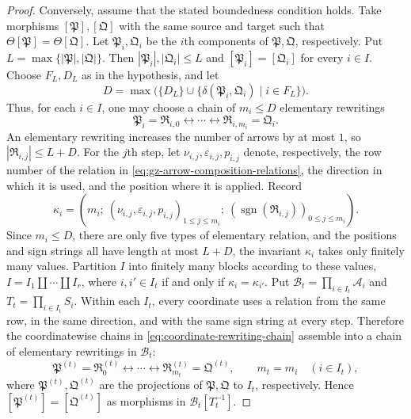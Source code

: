 \documentclass[10pt,a4paper]{amsart}
\theoremstyle{plain}
\theoremstyle{definition}
\theoremstyle{remark}
\begin{document}
\begin{proof}
  Conversely, assume that the stated boundedness condition holds.
  Take morphisms $[\mathfrak P],[\mathfrak Q]$ with the same source and target such that $\Theta[\mathfrak P]=\Theta[\mathfrak Q]$.
  Let $\mathfrak P_i,\mathfrak Q_i$ be the $i$th components of $\mathfrak P, \mathfrak Q$, respectively.
  Put $L=\max\{|\mathfrak P|,|\mathfrak Q|\}$.
  Then $|\mathfrak P_i|,|\mathfrak Q_i|\leq L$ and $[\mathfrak P_i]=[\mathfrak Q_i]$ for every $i\in I$.
  Choose $F_L,D_L$ as in the hypothesis, and let
  \begin{equation}\label{eq:uniform-rewriting-bound}
    D=\max\bigl(\{D_L\}\cup
    \{\delta(\mathfrak P_i,\mathfrak Q_i)\mid i\in F_L\}\bigr).
  \end{equation}
  Thus, for each $i\in I$, one may choose a chain of $m_i\leq D$ elementary rewritings
  \begin{equation}\label{eq:coordinate-rewriting-chain}
    \mathfrak P_i=\mathfrak R_{i,0}
    \longleftrightarrow\cdots
    \longleftrightarrow\mathfrak R_{i,m_i}=\mathfrak Q_i.
  \end{equation}
  An elementary rewriting increases the number of arrows by at most $1$, so $|\mathfrak R_{i,j}|\leq L+D$.
  For the $j$th step, let $\nu_{i,j},\varepsilon_{i,j},p_{i,j}$ denote, respectively, the row number of the relation in \eqref{eq:gz-arrow-composition-relations}, the direction in which it is used, and the position where it is applied.
  Record
  \[
    \kappa_i=\left(
    m_i;\
    (\nu_{i,j},\varepsilon_{i,j},p_{i,j})_{1\leq j\leq m_i};\
    (\operatorname{sgn}(\mathfrak R_{i,j}))_{0\leq j\leq m_i}
    \right).
  \]
  Since $m_i\leq D$, there are only five types of elementary relation, and the positions and sign strings all have length at most $L+D$, the invariant $\kappa_i$ takes only finitely many values.
  Partition $I$ into finitely many blocks according to these values, $I=I_1\amalg\cdots\amalg I_r$, where $i,i'\in I_t$ if and only if $\kappa_i=\kappa_{i'}$.
  Put $\mathcal B_t=\prod_{i\in I_t}\mathcal A_i$ and $T_t=\prod_{i\in I_t}S_i$.
  Within each $I_t$, every coordinate uses a relation from the same row, in the same direction, and with the same sign string at every step.
  Therefore the coordinatewise chains in \eqref{eq:coordinate-rewriting-chain} assemble into a chain of elementary rewritings in $\mathcal B_t$:
  \[
    \mathfrak P^{(t)}=\mathfrak R^{(t)}_0
    \longleftrightarrow\cdots
    \longleftrightarrow\mathfrak R^{(t)}_{m_t}=\mathfrak Q^{(t)},
    \qquad m_t=m_i\quad(i\in I_t),
  \]
  where $\mathfrak P^{(t)},\mathfrak Q^{(t)}$ are the projections of $\mathfrak P,\mathfrak Q$ to $I_t$, respectively.
  Hence $[\mathfrak P^{(t)}]=[\mathfrak Q^{(t)}]$ as morphisms in $\mathcal B_t[T_t^{-1}]$.


\end{proof}
\end{document}
